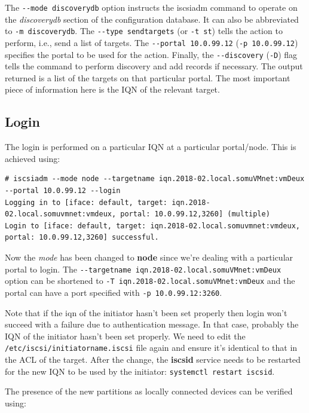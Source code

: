 \noindent
The \verb|--mode discoverydb| option instructs the iscsiadm command to operate on the \textit{discoverydb} section of the configuration database. It can also be abbreviated to \verb|-m discoverydb|. The \verb|--type sendtargets| (or \verb|-t st|) tells the action to perform, i.e., send a list of targets. The \verb|--portal 10.0.99.12| (\verb|-p 10.0.99.12|) specifies the portal to be used for the action. Finally, the \verb|--discovery| (\verb|-D|) flag tells the command to perform discovery and add records if necessary. The output returned is a list of the targets on that particular portal. The most important piece of information here is the IQN of the relevant target. 

\subsection{Login}
The login is performed on a particular IQN at a particular portal/node. This is achieved using:

\vspace{-15pt}
\begin{verbatim}
# iscsiadm --mode node --targetname iqn.2018-02.local.somuVMnet:vmDeux --portal 10.0.99.12 --login
Logging in to [iface: default, target: iqn.2018-02.local.somuvmnet:vmdeux, portal: 10.0.99.12,3260] (multiple)
Login to [iface: default, target: iqn.2018-02.local.somuvmnet:vmdeux, portal: 10.0.99.12,3260] successful.
\end{verbatim}
\vspace{-10pt}	

\noindent
Now the \textit{mode} has been changed to \textbf{node} since we're dealing with a particular portal to login. The \verb|--targetname iqn.2018-02.local.somuVMnet:vmDeux| option can be shortened to \verb|-T iqn.2018-02.local.somuVMnet:vmDeux| and the portal can have a port specified with \verb|-p 10.0.99.12:3260|.

Note that if the iqn of the initiator hasn't been set properly then login won't succeed with a failure due to authentication message. In that case, probably the IQN of the initiator hasn't been set properly. We need to edit the \verb|/etc/iscsi/initiatorname.iscsi| file again and ensure it's identical to that in the ACL of the target. After the change, the \textbf{iscsid} service needs to be restarted for the new IQN to be used by the initiator: \verb|systemctl restart iscsid|. 

The presence of the new partitions as locally connected devices can be verified using:

